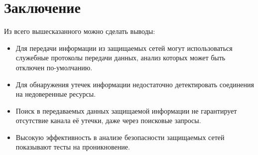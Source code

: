 \chapter*{Заключение}

Из всего вышесказанного можно сделать выводы:

\begin{itemize}
	\item
		Для передачи информации из защищаемых сетей могут использоваться служебные протоколы передачи данных, анализ которых может быть отключен по-умолчанию.
	\item
		Для обнаружения утечек информации недостаточно детектировать соединения на недоверенные ресурсы.
	\item
		Поиск в передаваемых данных защищаемой информации не гарантирует отсутствие канала её утечки, даже через поисковые запросы.
	\item
		Высокую эффективность в анализе безопасности защищаемых сетей показывают тесты на проникновение.
\end{itemize}

